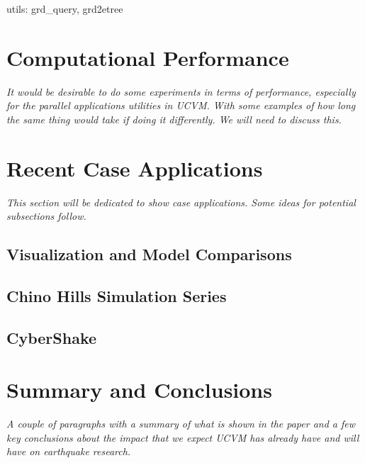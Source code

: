 utils: grd\_query, grd2etree

\section{Computational Performance}
\label{sec:conclusions}

\textit{
\color{blue}
It would be desirable to do some experiments in terms of performance, especially for the parallel applications utilities in UCVM. With some examples of how long the same thing would take if doing it differently. We will need to discuss this.
}

\section{Recent Case Applications}
\label{sec:conclusions}

\textit{
\color{blue}
This section will be dedicated to show case applications. Some ideas for potential subsections follow.
}

\subsection{Visualization and Model Comparisons}

\subsection{Chino Hills Simulation Series}

\subsection{CyberShake}

\section{Summary and Conclusions}
\label{sec:conclusions}

\textit{
\color{blue}
A couple of paragraphs with a summary of what is shown in the paper and a few key conclusions about the impact that we expect UCVM has already have and will have on earthquake research.
}


